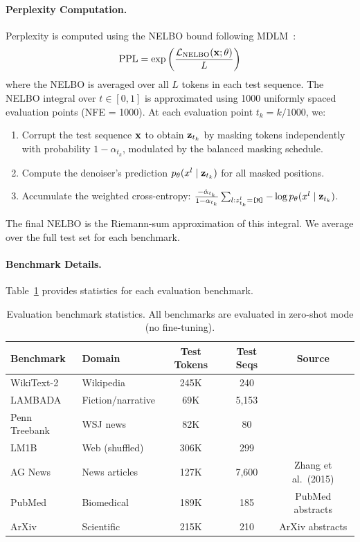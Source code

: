 \paragraph{Perplexity Computation.} Perplexity is computed using the NELBO bound following MDLM~\citep{mdlm}:
\begin{equation}
    \text{PPL} = \exp\left(\frac{\mathcal{L}_{\text{NELBO}}(\mathbf{x};\theta)}{L}\right)
\end{equation}
where the NELBO is averaged over all $L$ tokens in each test sequence. The NELBO integral over $t \in [0,1]$ is approximated using 1000 uniformly spaced evaluation points (NFE = 1000). At each evaluation point $t_k = k/1000$, we:
\begin{enumerate}[leftmargin=*,itemsep=1pt]
    \item Corrupt the test sequence $\mathbf{x}$ to obtain $\mathbf{z}_{t_k}$ by masking tokens independently with probability $1 - \alpha_{t_k}$, modulated by the balanced masking schedule.
    \item Compute the denoiser's prediction $p_\theta(x^l \mid \mathbf{z}_{t_k})$ for all masked positions.
    \item Accumulate the weighted cross-entropy: $\frac{-\dot\alpha_{t_k}}{1 - \alpha_{t_k}} \sum_{l: z^l_{t_k} = \texttt{[M]}} -\log p_\theta(x^l \mid \mathbf{z}_{t_k})$.
\end{enumerate}
The final NELBO is the Riemann-sum approximation of this integral. We average over the full test set for each benchmark.

\paragraph{Benchmark Details.} Table~\ref{tab:benchmark-details} provides statistics for each evaluation benchmark.

\begin{table}[H]
\centering
\caption{Evaluation benchmark statistics. All benchmarks are evaluated in zero-shot mode (no fine-tuning).}
\label{tab:benchmark-details}
\begin{tabular}{llccc}
\toprule
\textbf{Benchmark} & \textbf{Domain} & \textbf{Test Tokens} & \textbf{Test Seqs} & \textbf{Source} \\
\midrule
WikiText-2 & Wikipedia & 245K & 240 & \citet{wikitext} \\
LAMBADA & Fiction/narrative & 69K & 5,153 & \citet{lambada} \\
Penn Treebank & WSJ news & 82K & 80 & \citet{ptb} \\
LM1B & Web (shuffled) & 306K & 299 & \citet{lm1b} \\
AG News & News articles & 127K & 7,600 & Zhang et al.\ (2015) \\
PubMed & Biomedical & 189K & 185 & PubMed abstracts \\
ArXiv & Scientific & 215K & 210 & ArXiv abstracts \\
\bottomrule
\end{tabular}
\end{table}

